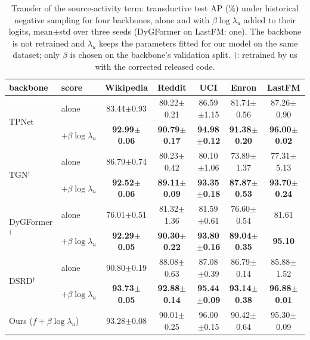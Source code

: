 \begin{table}[t]
\caption{Transfer of the source-activity term: transductive test AP (\%) under historical negative sampling for four backbones, alone and with $\beta\log\lambda_u$ added to their logits, mean{\tiny$\pm$std} over three seeds (DyGFormer on LastFM: one). The backbone is not retrained and $\lambda_u$ keeps the parameters fitted for our model on the same dataset; only $\beta$ is chosen on the backbone's validation split. $\dagger$: retrained by us with the corrected released code.}
\label{tab:transfer}
\centering
\scriptsize
\setlength{\tabcolsep}{2.5pt}
\renewcommand{\arraystretch}{0.95}
\begin{tabular}{llccccc}
\toprule
backbone & score & Wikipedia & Reddit & UCI & Enron & LastFM \\
\midrule
\multirow{2}{*}{TPNet} & alone & 83.44{\tiny$\pm$0.93} & 80.22{\tiny$\pm$0.21} & 86.59{\tiny$\pm$1.15} & 81.74{\tiny$\pm$0.56} & 87.26{\tiny$\pm$0.90} \\
 & $+\beta\log\lambda_u$ & \textbf{92.99{\tiny$\pm$0.06}} & \textbf{90.79{\tiny$\pm$0.17}} & \textbf{94.98{\tiny$\pm$0.12}} & \textbf{91.38{\tiny$\pm$0.20}} & \textbf{96.00{\tiny$\pm$0.02}} \\
\midrule
\multirow{2}{*}{TGN$^\dagger$} & alone & 86.79{\tiny$\pm$0.74} & 80.23{\tiny$\pm$0.42} & 80.10{\tiny$\pm$1.06} & 73.89{\tiny$\pm$1.37} & 77.31{\tiny$\pm$5.13} \\
 & $+\beta\log\lambda_u$ & \textbf{92.52{\tiny$\pm$0.06}} & \textbf{89.11{\tiny$\pm$0.09}} & \textbf{93.35{\tiny$\pm$0.18}} & \textbf{87.87{\tiny$\pm$0.53}} & \textbf{93.70{\tiny$\pm$0.24}} \\
\midrule
\multirow{2}{*}{DyGFormer$^\dagger$} & alone & 76.01{\tiny$\pm$0.51} & 81.32{\tiny$\pm$1.36} & 81.59{\tiny$\pm$0.61} & 76.60{\tiny$\pm$0.54} & 81.61 \\
 & $+\beta\log\lambda_u$ & \textbf{92.29{\tiny$\pm$0.05}} & \textbf{90.30{\tiny$\pm$0.22}} & \textbf{93.80{\tiny$\pm$0.16}} & \textbf{89.04{\tiny$\pm$0.35}} & \textbf{95.10} \\
\midrule
\multirow{2}{*}{DSRD$^\dagger$} & alone & 90.80{\tiny$\pm$0.19} & 88.08{\tiny$\pm$0.63} & 87.08{\tiny$\pm$0.39} & 86.79{\tiny$\pm$0.14} & 85.88{\tiny$\pm$1.52} \\
 & $+\beta\log\lambda_u$ & \textbf{93.73{\tiny$\pm$0.05}} & \textbf{92.88{\tiny$\pm$0.14}} & \textbf{95.44{\tiny$\pm$0.09}} & \textbf{93.14{\tiny$\pm$0.38}} & \textbf{96.88{\tiny$\pm$0.01}} \\
\midrule
\multicolumn{2}{l}{Ours ($f+\beta\log\lambda_u$)} & 93.28{\tiny$\pm$0.08} & 90.01{\tiny$\pm$0.25} & 96.00{\tiny$\pm$0.15} & 90.42{\tiny$\pm$0.64} & 95.30{\tiny$\pm$0.09} \\
\bottomrule
\end{tabular}
\end{table}
